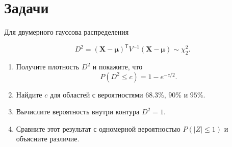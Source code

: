 \documentclass[
  russian,
  11pt,
  a4paper,
  open=any]{scrbook}
\providecommand{\tightlist}{%
  \setlength{\itemsep}{0pt}\setlength{\parskip}{0pt}}
\begin{document}
\section{Задачи}\label{ux437ux430ux434ux430ux447ux438-6}

\begin{semanticpdfbox}[colback=BookCoralSoft,borderline west={1.2mm}{0pt}{BookCoral}]

\par\nopagebreak[4]\vspace{1.2mm}

Для двумерного гауссова распределения

\[
D^2=(\mathbf X-\boldsymbol\mu)^{\mathsf T}
V^{-1}(\mathbf X-\boldsymbol\mu)
\sim\chi_2^2.
\]

\begin{enumerate}
\def\labelenumi{\arabic{enumi}.}
\tightlist
\item
  Получите плотность \(D^2\) и покажите, что \[
  P(D^2\leq c)=1-e^{-c/2}.
  \]
\item
  Найдите \(c\) для областей с вероятностями \(68.3\%\), \(90\%\) и
  \(95\%\).
\item
  Вычислите вероятность внутри контура \(D^2=1\).
\item
  Сравните этот результат с одномерной вероятностью \(P(|Z|\leq1)\) и
  объясните различие.
\end{enumerate}

\end{semanticpdfbox}
\end{document}
